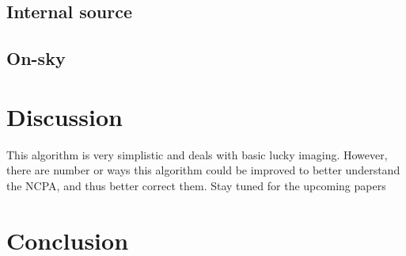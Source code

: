 \documentclass[twocolumn]{aastex62}
\begin{document}
\subsection{Internal source}
\subsection{On-sky}


\section{Discussion}
This algorithm is very simplistic and deals with basic lucky imaging. However, there are number or ways this algorithm could be improved to better understand the NCPA, and thus better correct them. Stay tuned for the upcoming papers 

\section{Conclusion}

\newpage


\end{document}
